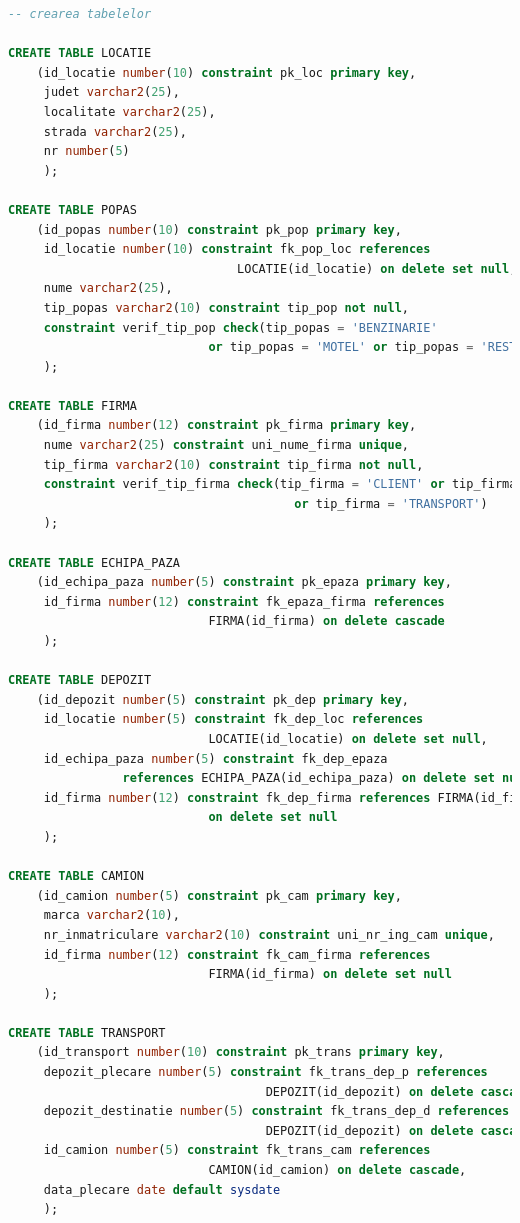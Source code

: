 \documentclass[12pt, a4paper]{article}
\begin{document}
\begin{lstlisting}[language=SQL]
-- crearea tabelelor 

CREATE TABLE LOCATIE
    (id_locatie number(10) constraint pk_loc primary key,
     judet varchar2(25),
     localitate varchar2(25),
     strada varchar2(25),
     nr number(5)
     );
     
CREATE TABLE POPAS
    (id_popas number(10) constraint pk_pop primary key,
     id_locatie number(10) constraint fk_pop_loc references 
                                LOCATIE(id_locatie) on delete set null,
     nume varchar2(25),
     tip_popas varchar2(10) constraint tip_pop not null,
     constraint verif_tip_pop check(tip_popas = 'BENZINARIE' 
                            or tip_popas = 'MOTEL' or tip_popas = 'RESTAURANT')
     );
     
CREATE TABLE FIRMA
    (id_firma number(12) constraint pk_firma primary key,
     nume varchar2(25) constraint uni_nume_firma unique,
     tip_firma varchar2(10) constraint tip_firma not null,
     constraint verif_tip_firma check(tip_firma = 'CLIENT' or tip_firma = 'PAZA'
                                        or tip_firma = 'TRANSPORT')
     );
     
CREATE TABLE ECHIPA_PAZA
    (id_echipa_paza number(5) constraint pk_epaza primary key,
     id_firma number(12) constraint fk_epaza_firma references 
                            FIRMA(id_firma) on delete cascade
     );
     
CREATE TABLE DEPOZIT
    (id_depozit number(5) constraint pk_dep primary key,
     id_locatie number(5) constraint fk_dep_loc references 
                            LOCATIE(id_locatie) on delete set null,
     id_echipa_paza number(5) constraint fk_dep_epaza 
                references ECHIPA_PAZA(id_echipa_paza) on delete set null,
     id_firma number(12) constraint fk_dep_firma references FIRMA(id_firma) 
                            on delete set null
     );

CREATE TABLE CAMION
    (id_camion number(5) constraint pk_cam primary key,
     marca varchar2(10),
     nr_inmatriculare varchar2(10) constraint uni_nr_ing_cam unique,
     id_firma number(12) constraint fk_cam_firma references 
                            FIRMA(id_firma) on delete set null
     );
     
CREATE TABLE TRANSPORT
    (id_transport number(10) constraint pk_trans primary key,
     depozit_plecare number(5) constraint fk_trans_dep_p references 
                                    DEPOZIT(id_depozit) on delete cascade,
     depozit_destinatie number(5) constraint fk_trans_dep_d references 
                                    DEPOZIT(id_depozit) on delete cascade,
     id_camion number(5) constraint fk_trans_cam references 
                            CAMION(id_camion) on delete cascade,
     data_plecare date default sysdate
     );
     

\end{lstlisting}
\end{document}
